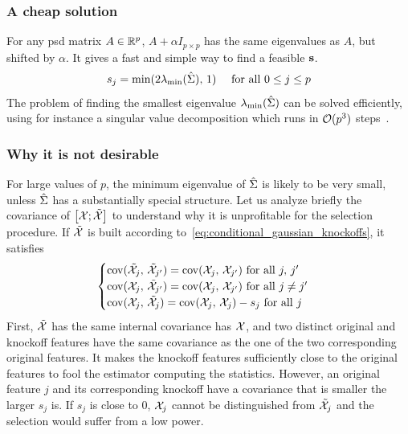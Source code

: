 \subsubsection{A cheap solution}

For any psd matrix $A \in \mathbb{R}^p$, $A + \alpha I_{p \times p}$ has the same eigenvalues as $A$, but shifted by $\alpha$.
It gives a fast and simple way to find a feasible $\mathbf{s}$.
\begin{equation}\label{eq:equi}
    s_j = \min(2\lambda_{\min}(\hat{\Sigma}),\, 1)
    \quad\text{ for all } 0 \leq j \leq p
\end{equation}
The problem of finding the smallest eigenvalue $\lambda_{\min}(\hat{\Sigma})$ can be solved efficiently,
using for instance a singular value decomposition which runs in $\mathcal{O}(p^3)$ steps~\cite{svd}.

\subsubsection{Why it is not desirable}

For large values of $p$,
the minimum eigenvalue of $\hat{\Sigma}$ is likely to be very small,
unless $\hat{\Sigma}$ has a substantially special structure.
Let us analyze briefly the covariance of $\big[ \mathcal{X}; \tilde{\mathcal{X}} \big]$
to understand why it is unprofitable for the selection procedure.
If $\tilde{\mathcal{X}}$ is built according to~\ref{eq:conditional_gaussian_knockoffs}, it satisfies
\begin{equation*}
    \begin{cases}
        \operatorname*{cov}(\tilde{\mathcal{X}}_j,\, \tilde{\mathcal{X}}_{j'}) = \operatorname*{cov}(\mathcal{X}_j,\, \mathcal{X}_{j'}) \text{ for all } j,\,j'\\
        \operatorname*{cov}(\mathcal{X}_j,\, \tilde{\mathcal{X}}_{j'}) = \operatorname*{cov}(\mathcal{X}_j,\, \mathcal{X}_{j'}) \text{ for all } j \neq j'\\
        \operatorname*{cov}(\mathcal{X}_j,\, \tilde{\mathcal{X}}_j) = \operatorname*{cov}(\mathcal{X}_j,\, \mathcal{X}_j) - s_j \text{ for all } j
    \end{cases}
\end{equation*}
First, $\tilde{\mathcal{X}}$ has the same internal covariance has $\mathcal{X}$,
and two distinct original and knockoff features have the same covariance
as the one of the two corresponding original features.
It makes the knockoff features sufficiently close to the original features
to fool the estimator computing the statistics.
However, an original feature $j$ and its corresponding knockoff have a covariance that is smaller the larger $s_j$ is.
If $s_j$ is close to $0$,
$\mathcal{X}_j$ cannot be distinguished from $\tilde{\mathcal{X}}_j$ and the selection would suffer from a low power.

